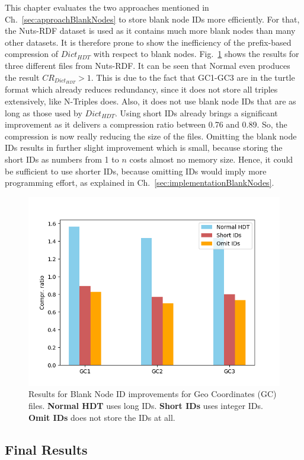 This chapter evaluates the two approaches mentioned in Ch.~\ref{sec:approachBlankNodes} to store blank node IDs more efficiently. For that, the Nuts-RDF dataset is used as it contains much more blank nodes than many other datasets. It is therefore prone to show the inefficiency of the prefix-based compression of $Dict_{HDT}$ with respect to blank nodes. Fig.~\ref{fig:blanknodes} shows the results for three different files from Nuts-RDF. It can be seen that Normal \DHDT{} even produces the result $CR_{Dict_{HDT}}>1$. This is due to the fact that GC1-GC3 are in the turtle format which already reduces redundancy, since it does not store all triples extensively, like N-Triples does. Also, it does not use blank node IDs that are as long as those used by $Dict_{HDT}$. Using short IDs already brings a significant improvement as it delivers a compression ratio between 0.76 and 0.89. So, the compression is now really reducing the size of the files. Omitting the blank node IDs results in further slight improvement which is small, because storing the short IDs as numbers from 1 to $n$ costs almost no memory size. Hence, it could be sufficient to use shorter IDs, because omitting IDs would imply more programming effort, as explained in Ch.~\ref{sec:implementationBlankNodes}.


\begin{figure}
	\centering
	\includegraphics[width=0.8\linewidth]{figures/4_evaluation/blankNodes}
	\caption{Results for Blank Node ID improvements for Geo Coordinates (GC) files. \textbf{Normal HDT} uses long IDs. \textbf{Short IDs} uses integer IDs. \textbf{Omit IDs} does not store the IDs at all.}
	\label{fig:blanknodes}
\end{figure}

\FloatBarrier
\subsection{Final Results}\label{sec:evaluationFinal}

